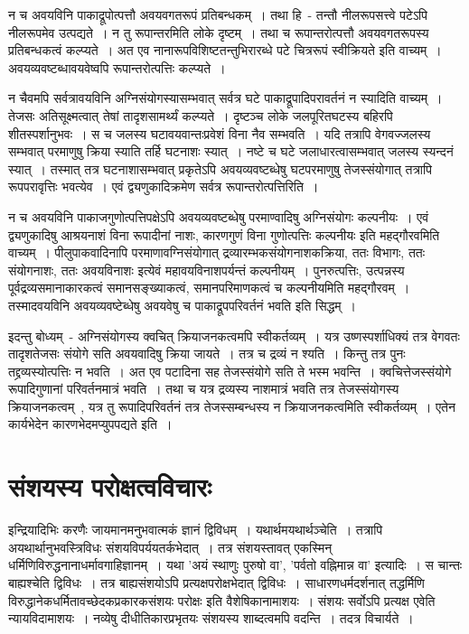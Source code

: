 		न च अवयविनि पाकाद्रूपोत्पत्तौ अवयवगतरूपं प्रतिबन्धकम्~। तथा हि~- तन्तौ नीलरूपसत्त्वे पटेऽपि नीलरूपमेव उत्पद्यते~। न तु रूपान्तरमिति लोके दृष्टम्~। तथा च रूपान्तरोत्पत्तौ अवयवगतरूपस्य प्रतिबन्धकत्वं कल्प्यते~। अत एव नानारूपविशिष्टतन्तुभिरारब्धे पटे चित्ररूपं स्वीक्रियते इति वाच्यम्~। अवयव्यवष्टब्धावयवेष्वपि रूपान्तरोत्पत्तिः कल्प्यते~। 

		न चैवमपि सर्वत्रावयविनि अग्निसंयोगस्यासम्भवात् सर्वत्र घटे पाकाद्रूपादिपरावर्तनं न स्यादिति वाच्यम्~। तेजसः अतिसूक्ष्मत्वात् तेषां तादृशसामर्थ्यं कल्प्यते~।‌ दृष्टञ्च लोके जलपूरितघटस्य बहिरपि शीतस्पर्शानुभवः~। स च जलस्य घटावयवान्तःप्रवेशं विना नैव सम्भवति~। यदि तत्रापि वेगवज्जलस्य सम्भवात् परमाणुषु क्रिया स्याति तर्हि घटनाशः स्यात्~। नष्टे च घटे जलाधारत्वासम्भवात् जलस्य स्यन्दनं स्यात्~। तस्मात् तत्र घटनाशासम्भवात् प्रकृतेऽपि अवयव्यवष्टब्धेषु घटपरमाणुषु तेजस्संयोगात् तत्रापि रूपपरावृत्तिः भवत्येव~।‌ एवं द्व्यणुकादिक्रमेण सर्वत्र रूपान्तरोत्पत्तिरिति~।

		न च अवयविनि पाकाजगुणोत्पत्तिपक्षेऽपि  अवयव्यवष्टब्धेषु परमाण्वादिषु अग्निसंयोगः कल्पनीयः~। एवं द्व्यणुकादिषु आश्रयनाशं विना रूपादीनां नाशः, कारणगुणं विना गुणोत्पत्तिः कल्पनीयः इति महद्गौरवमिति वाच्यम्~। पीलुपाकवादिनापि परमाणावग्निसंयोगात् द्रव्यारम्भकसंयोगनाशकक्रिया, ततः विभागः, ततः संयोगनाशः, ततः अवयविनाशः इत्येवं महावयविनाशपर्यन्तं कल्पनीयम्~। पुनरुत्पत्तिः, उत्पन्नस्य पूर्वद्रव्यसमानाकारकत्वं समानसङ्ख्याकत्वं, समानपरिमाणकत्वं च कल्पनीयमिति महद्गौरवम्~। तस्मादवयविनि अवयव्यवष्टेब्धेषु अवयवेषु च पाकाद्रूपपरिवर्तनं भवति इति सिद्धम्~।

		इदन्तु बोध्यम्~- अग्निसंयोगस्य क्वचित् क्रियाजनकत्वमपि स्वीकर्तव्यम्~। यत्र उष्णस्पर्शाधिक्यं तत्र वेगवतः तादृशतेजसः संयोगे सति अवयवादिषु क्रिया जायते~। तत्र च द्रव्यं न श्यति~। किन्तु तत्र पुनः तद्द्रव्यस्योत्पत्तिः न भवति~। अत एव पटादिना सह तेजस्संयोगे सति ते भस्म भवन्ति~। क्वचित्तेजस्संयोगे रूपादिगुणानां परिवर्तनमात्रं भवति~। तथा च यत्र द्रव्यस्य नाशमात्रं भवति तत्र तेजस्संयोगस्य क्रियाजनकत्वम्~, यत्र तु रूपादिपरिवर्तनं तत्र तेजस्सम्बन्धस्य  न क्रियाजनकत्वमिति स्वीकर्तव्यम्~। एतेन कार्यभेदेन कारणभेदमप्युपपद्यते इति~।

	\section{संशयस्य परोक्षत्वविचारः}

	इन्द्रियादिभिः करणैः जायमानमनुभवात्मकं ज्ञानं द्विविधम्~। यथार्थमयथार्थञ्चेति~। तत्रापि अयथार्थानुभवस्त्रिविधः संशयविपर्ययतर्कभेदात्~। तत्र संशयस्तावत् एकस्मिन् धर्मिणिविरुद्धनानाधर्मावगाहिज्ञानम्~। यथा 'अयं स्थाणुः पुरुषो वा', 'पर्वतो वह्निमान्न वा' इत्यादिः~। स चान्तः बाह्यश्चेति द्विविधः~। तत्र बाह्यसंशयोऽपि प्रत्यक्षपरोक्षभेदात् द्विविधः~। साधारणधर्मदर्शनात् तद्धर्मिणि विरुद्धानेकधर्मितावच्छेदकप्रकारकसंशयः परोक्षः इति वैशेषिकानामाशयः~। संशयः सर्वोऽपि प्रत्यक्ष एवेति न्यायविदामाशयः~। नव्येषु दीधीतिकारप्रभृतयः संशयस्य शाब्दत्वमपि वदन्ति~। तदत्र विचार्यते~।

